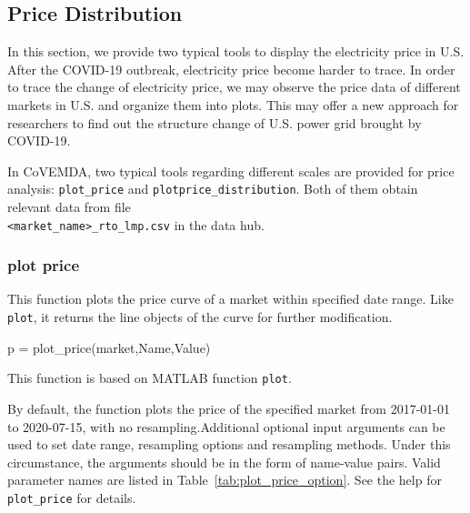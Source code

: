 \documentclass[11pt]{article}
\newcommand{\covemda}{CoVEMDA}
\newcommand{\matlab}{\textsc{MATLAB}}
\numberwithin{equation}{section}
\numberwithin{table}{section}
\numberwithin{figure}{section}
\begin{document}
\subsection{Price Distribution}

In this section, we provide two typical tools to display the electricity price in U.S.  After the COVID-19 outbreak, electricity price become harder to trace. In order to trace the change of electricity price, we may observe the price data of different markets in U.S. and organize them into plots. This may offer a new approach for researchers to find out the structure change of U.S. power grid brought by COVID-19.

In \covemda{}, two typical tools regarding different scales are provided for price analysis: \verb!plot_price! and \verb!plotprice_distribution!. Both of them obtain relevant data from file \\\verb!<market_name>_rto_lmp.csv! in the data hub.

\subsubsection{plot price}

This function plots the price curve of a market within specified date range. Like \verb!plot!, it returns the line objects of the curve for further modification.

\begin{Code}
  p = plot_price(market,Name,Value)
\end{Code}

This function is based on \matlab{} function \verb!plot!.

By default, the function plots the price of the specified market from 2017-01-01 to 2020-07-15, with no resampling.Additional optional input arguments can be used to set date range, resampling options and resampling methods. Under this circumstance, the arguments should be in the form of name-value pairs. Valid parameter names are listed in Table~\ref{tab:plot_price_option}. See the help for \verb!plot_price! for details.
\end{document}
